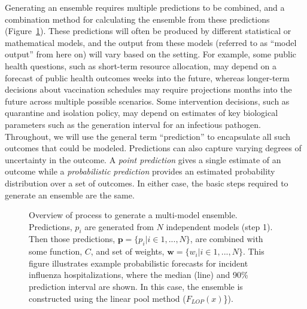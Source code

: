 \documentclass[
  letterpaper,
  DIV=11,
  numbers=noendperiod]{scrartcl}
\begin{document}
Generating an ensemble requires multiple predictions to be combined, and
a combination method for calculating the ensemble from these predictions
(Figure~\ref{fig-ensemble-schematic}). These predictions will often be
produced by different statistical or mathematical models, and the output
from these models (referred to as ``model output'' from here on) will
vary based on the setting. For example, some public health questions,
such as short-term resource allocation, may depend on a forecast of
public health outcomes weeks into the future, whereas longer-term
decisions about vaccination schedules may require projections months
into the future across multiple possible scenarios. Some intervention
decisions, such as quarantine and isolation policy, may depend on
estimates of key biological parameters such as the generation interval
for an infectious pathogen. Throughout, we will use the general term
``prediction'' to encapsulate all such outcomes that could be modeled.
Predictions can also capture varying degrees of uncertainty in the
outcome. A \emph{point prediction} gives a single estimate of an outcome
while a \emph{probabilistic prediction} provides an estimated
probability distribution over a set of outcomes. In either case, the
basic steps required to generate an ensemble are the same.

\begin{figure}


\caption{\label{fig-ensemble-schematic}Overview of process to generate a
multi-model ensemble. Predictions, \(p_i\) are generated from \(N\)
independent models (step 1). Then those predictions,
\(\pmb{p} = \{p_i|i \in 1, ..., N\}\), are combined with some function,
\(C\), and set of weights, \(\pmb{w} = \{w_i|i \in 1, ..., N\}\). This
figure illustrates example probabilistic forecasts for incident
influenza hospitalizations, where the median (line) and 90\% prediction
interval are shown. In this case, the ensemble is constructed using the
linear pool method (\(F_{LOP}(x)\)\}).}

\end{figure}%
\end{document}
